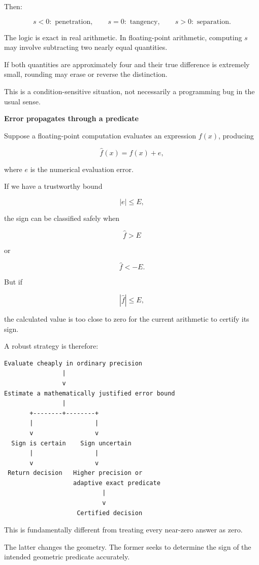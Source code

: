 Then:

\[
s<0:\text{ penetration},\qquad s=0:\text{ tangency},\qquad s>0:\text{ separation}.
\]

The logic is exact in real arithmetic. In floating-point arithmetic, computing \(s\) may involve subtracting two nearly equal quantities.

If both quantities are approximately four and their true difference is extremely small, rounding may erase or reverse the distinction.

This is a condition-sensitive situation, not necessarily a programming bug in the usual sense.

\textbf{Error propagates through a predicate}

Suppose a floating-point computation evaluates an expression \(f(x)\), producing

\[
\widehat f(x)=f(x)+e,
\]

where \(e\) is the numerical evaluation error.

If we have a trustworthy bound

\[
|e|\le E,
\]

the sign can be classified safely when

\[
\widehat f>E
\]

or

\[
\widehat f<-E.
\]

But if

\[
|\widehat f|\le E,
\]

the calculated value is too close to zero for the current arithmetic to certify its sign.

A robust strategy is therefore:

\begin{verbatim}
Evaluate cheaply in ordinary precision
                |
                v
Estimate a mathematically justified error bound
                |
       +--------+--------+
       |                 |
       v                 v
  Sign is certain    Sign uncertain
       |                 |
       v                 v
 Return decision   Higher precision or
                   adaptive exact predicate
                           |
                           v
                    Certified decision
\end{verbatim}

This is fundamentally different from treating every near-zero answer as zero.

The latter changes the geometry. The former seeks to determine the sign of the intended geometric predicate accurately.

